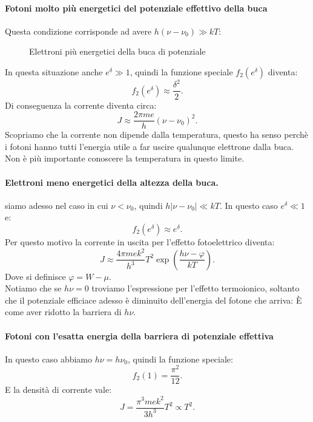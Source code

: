 \paragraph{Fotoni molto più energetici del potenziale effettivo della buca}
Questa condizione corrisponde ad avere $h\left( \nu -\nu_0 \right) \gg kT$:
\begin{figure}[H]
    \centering
    \caption{\scriptsize Elettroni più energetici della buca di potenziale}
    \label{fig:elettroni-pi-energetici-della-buca-di-potenziale}
\end{figure}
\noindent
In questa situazione anche $e^{\delta }\gg 1$, quindi la funzione speciale $f_2( e^{\delta }) $ diventa:
\[
	f_2( e^{\delta }) \approx \frac{\delta ^2}{2}
.\] 
Di conseguenza la corrente diventa circa:
\[
	J \approx \frac{2\pi m e}{h} \left( \nu -\nu_0 \right)^2
.\] 
Scopriamo che la corrente non dipende dalla temperatura, questo ha senso perchè i fotoni hanno tutti l'energia utile a far uscire qualunque elettrone dalla buca. Non è più importante conoscere la temperatura in questo limite.\\
\paragraph{Elettroni meno energetici della altezza della buca.}
siamo adesso nel caso in cui $\nu < \nu_0$, quindi $h\left| \nu -\nu_0 \right| \ll kT$. In questo caso $e^{\delta }\ll 1$ e:
\[
	f_2( e^{\delta }) \approx e^{\delta }
.\] 
Per questo motivo la corrente in uscita per l'effetto fotoelettrico diventa:
\[
	J \approx \frac{4\pi m e k^2}{h^3}T^2 \exp\left(  \frac{h\nu - \varphi}{kT}\right) 
.\] 
Dove si definisce $\varphi = W - \mu $.\\
Notiamo che se $h\nu = 0$ troviamo l'espressione per l'effetto termoionico, soltanto che il potenziale efficiace adesso è diminuito dell'energia del fotone che arriva: È come aver ridotto la barriera di $h\nu $.
\paragraph{Fotoni con l'esatta energia della barriera di potenziale effettiva}
In questo caso abbiamo $h\nu = h\nu_0$, quindi la funzione speciale:
\[
	f_2( 1) = \frac{\pi^2}{12}
.\] 
E la densità di corrente vale:
\[
	J = \frac{\pi^3 m e k^2}{3h^3}T^2 \propto T^2
.\] 

